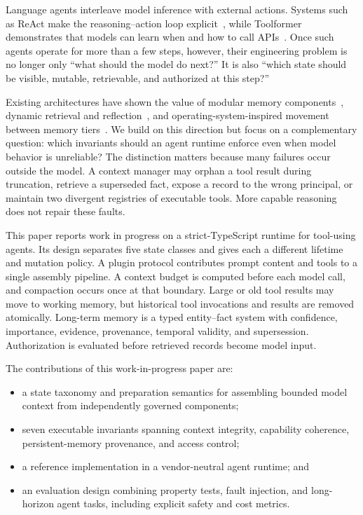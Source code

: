 \documentclass[sigplan,10pt,anonymous,review]{acmart}
\begin{document}
Language agents interleave model inference with external actions.  Systems
such as ReAct make the reasoning--action loop explicit~\cite{yao2023react},
while Toolformer demonstrates that models can learn when and how to call
APIs~\cite{schick2023toolformer}.  Once such agents operate for more than a
few steps, however, their engineering problem is no longer only ``what should
the model do next?''  It is also ``which state should be visible, mutable,
retrievable, and authorized at this step?''

Existing architectures have shown the value of modular memory
components~\cite{sumers2023coala}, dynamic retrieval and
reflection~\cite{park2023generative}, and operating-system-inspired movement
between memory tiers~\cite{packer2023memgpt}.  We build on this direction but
focus on a complementary question: which invariants should an agent runtime
enforce even when model behavior is unreliable?  The distinction matters
because many failures occur outside the model.  A context manager may orphan a
tool result during truncation, retrieve a superseded fact, expose a record to
the wrong principal, or maintain two divergent registries of executable tools.
More capable reasoning does not repair these faults.

This paper reports work in progress on a strict-TypeScript runtime for
tool-using agents.  Its design separates five state classes and gives each a
different lifetime and mutation policy.  A plugin protocol contributes prompt
content and tools to a single assembly pipeline.  A context budget is computed
before each model call, and compaction occurs once at that boundary.  Large or
old tool results may move to working memory, but historical tool invocations
and results are removed atomically.  Long-term memory is a typed entity--fact
system with confidence, importance, evidence, provenance, temporal validity,
and supersession.  Authorization is evaluated before retrieved records become
model input.

The contributions of this work-in-progress paper are:

\begin{itemize}
  \item a state taxonomy and preparation semantics for assembling bounded
        model context from independently governed components;
  \item seven executable invariants spanning context integrity, capability
        coherence, persistent-memory provenance, and access control;
  \item a reference implementation in a vendor-neutral agent runtime; and
  \item an evaluation design combining property tests, fault injection, and
        long-horizon agent tasks, including explicit safety and cost metrics.
\end{itemize}
\end{document}
